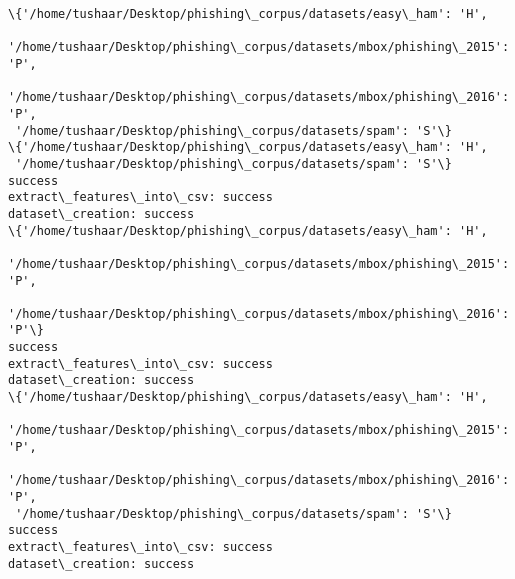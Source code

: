 \documentclass[11pt]{article}
\begin{document}
    \begin{Verbatim}[commandchars=\\\{\}]
\{'/home/tushaar/Desktop/phishing\_corpus/datasets/easy\_ham': 'H',
 '/home/tushaar/Desktop/phishing\_corpus/datasets/mbox/phishing\_2015': 'P',
 '/home/tushaar/Desktop/phishing\_corpus/datasets/mbox/phishing\_2016': 'P',
 '/home/tushaar/Desktop/phishing\_corpus/datasets/spam': 'S'\}
\{'/home/tushaar/Desktop/phishing\_corpus/datasets/easy\_ham': 'H',
 '/home/tushaar/Desktop/phishing\_corpus/datasets/spam': 'S'\}
success
extract\_features\_into\_csv: success
dataset\_creation: success
\{'/home/tushaar/Desktop/phishing\_corpus/datasets/easy\_ham': 'H',
 '/home/tushaar/Desktop/phishing\_corpus/datasets/mbox/phishing\_2015': 'P',
 '/home/tushaar/Desktop/phishing\_corpus/datasets/mbox/phishing\_2016': 'P'\}
success
extract\_features\_into\_csv: success
dataset\_creation: success
\{'/home/tushaar/Desktop/phishing\_corpus/datasets/easy\_ham': 'H',
 '/home/tushaar/Desktop/phishing\_corpus/datasets/mbox/phishing\_2015': 'P',
 '/home/tushaar/Desktop/phishing\_corpus/datasets/mbox/phishing\_2016': 'P',
 '/home/tushaar/Desktop/phishing\_corpus/datasets/spam': 'S'\}
success
extract\_features\_into\_csv: success
dataset\_creation: success

    \end{Verbatim}


    
    
    
    
\end{document}
